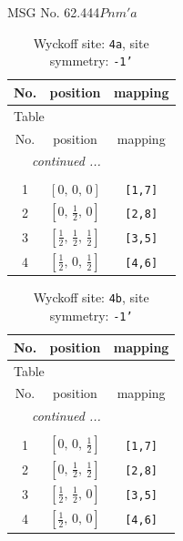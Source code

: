 \documentclass[fleqn,8pt]{jsarticle}
\begin{document}
\setcounter{MaxMatrixCols}{32}

\renewcommand{\tablename}{Table~}
\renewcommand{\figurename}{Figure~}
\begin{center}
\LARGE
MSG No. 62.444\quad$Pnm'a$
\end{center}
\renewcommand{\arraystretch}{1.2}
\begin{longtable}{ccc}
\caption{Wyckoff site: {\tt 4a}, site symmetry: {\tt -1'}}
 \\
 \hline \hline
No. & position & mapping \\ \hline \endfirsthead

\multicolumn{2}{l}{\tablename\ \thetable{}} \\
 \hline \hline
No. & position & mapping \\ \hline \endhead

 \hline \hline
\multicolumn{2}{r}{\footnotesize\it continued ...} \\ \endfoot

 \hline \hline
\multicolumn{2}{r}{} \\ \endlastfoot

1 & $\left[ 0,\, 0,\, 0 \right]$ & {\tt [1,7]} \\ \hline
2 & $\left[ 0,\, \frac{1}{2},\, 0 \right]$ & {\tt [2,8]} \\ \hline
3 & $\left[ \frac{1}{2},\, \frac{1}{2},\, \frac{1}{2} \right]$ & {\tt [3,5]} \\ \hline
4 & $\left[ \frac{1}{2},\, 0,\, \frac{1}{2} \right]$ & {\tt [4,6]} \\
\end{longtable}
\renewcommand{\arraystretch}{1.2}
\begin{longtable}{ccc}
\caption{Wyckoff site: {\tt 4b}, site symmetry: {\tt -1'}}
 \\
 \hline \hline
No. & position & mapping \\ \hline \endfirsthead

\multicolumn{2}{l}{\tablename\ \thetable{}} \\
 \hline \hline
No. & position & mapping \\ \hline \endhead

 \hline \hline
\multicolumn{2}{r}{\footnotesize\it continued ...} \\ \endfoot

 \hline \hline
\multicolumn{2}{r}{} \\ \endlastfoot

1 & $\left[ 0,\, 0,\, \frac{1}{2} \right]$ & {\tt [1,7]} \\ \hline
2 & $\left[ 0,\, \frac{1}{2},\, \frac{1}{2} \right]$ & {\tt [2,8]} \\ \hline
3 & $\left[ \frac{1}{2},\, \frac{1}{2},\, 0 \right]$ & {\tt [3,5]} \\ \hline
4 & $\left[ \frac{1}{2},\, 0,\, 0 \right]$ & {\tt [4,6]} \\
\end{longtable}
\end{document}
